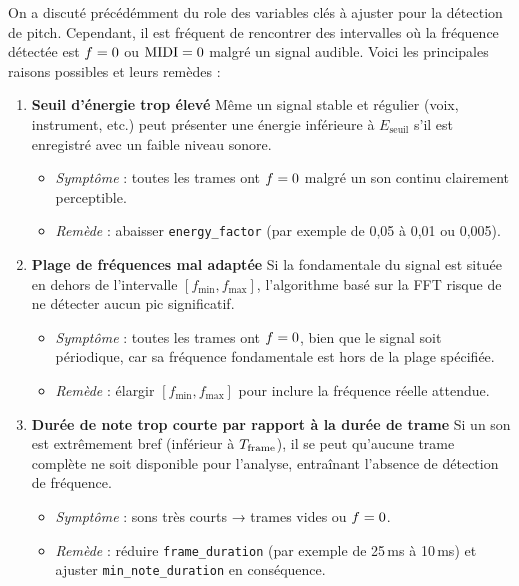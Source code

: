 On a discuté précédémment du role des variables clés à ajuster pour la détection de pitch. Cependant, il est fréquent de rencontrer des intervalles où la fréquence détectée est \(f = 0\) ou \(\mathrm{MIDI} = 0\) malgré un signal audible. Voici les principales raisons possibles et leurs remèdes :
\begin{enumerate}
  \item \textbf{Seuil d’énergie trop élevé}  
    Même un signal stable et régulier (voix, instrument, etc.) peut présenter une énergie inférieure à \(E_{\text{seuil}}\) s’il est enregistré avec un faible niveau sonore.  
    \begin{itemize}
      \item \emph{Symptôme} : toutes les trames ont \(f = 0\) malgré un son continu clairement perceptible.  
      \item \emph{Remède} : abaisser \texttt{energy\_factor} (par exemple de 0{,}05 à 0{,}01 ou 0{,}005).  
    \end{itemize}

  \item \textbf{Plage de fréquences mal adaptée}  
    Si la fondamentale du signal est située en dehors de l’intervalle \([f_{\min}, f_{\max}]\), l’algorithme basé sur la FFT risque de ne détecter aucun pic significatif.  
    \begin{itemize}
      \item \emph{Symptôme} : toutes les trames ont \(f = 0\), bien que le signal soit périodique, car sa fréquence fondamentale est hors de la plage spécifiée.  
      \item \emph{Remède} : élargir \([f_{\min}, f_{\max}]\) pour inclure la fréquence réelle attendue.  
    \end{itemize}

  \item \textbf{Durée de note trop courte par rapport à la durée de trame}  
    Si un son est extrêmement bref (inférieur à \(T_\mathrm{frame}\)), il se peut qu’aucune trame complète ne soit disponible pour l’analyse, entraînant l’absence de détection de fréquence.  
    \begin{itemize}
      \item \emph{Symptôme} : sons très courts → trames vides ou \(f = 0\).  
      \item \emph{Remède} : réduire \texttt{frame\_duration} (par exemple de 25\,ms à 10\,ms) et ajuster \texttt{min\_note\_duration} en conséquence.  
    \end{itemize}


\end{enumerate}
